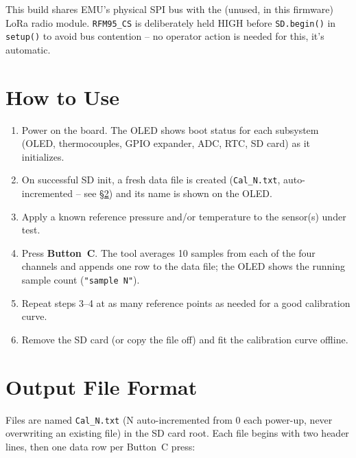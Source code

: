 \documentclass[11pt,letterpaper]{article}
\begin{document}
\begin{notebox}
This build shares EMU's physical SPI bus with the (unused, in this
firmware) LoRa radio module. \texttt{RFM95\_CS} is deliberately held HIGH
before \texttt{SD.begin()} in \texttt{setup()} to avoid bus contention --
no operator action is needed for this, it's automatic.
\end{notebox}

\section{How to Use}

\begin{enumerate}[nosep]
  \item Power on the board. The OLED shows boot status for each subsystem
        (OLED, thermocouples, GPIO expander, ADC, RTC, SD card) as it
        initializes.
  \item On successful SD init, a fresh data file is created
        (\texttt{Cal\_N.txt}, auto-incremented -- see §\ref{sec:output}) and
        its name is shown on the OLED.
  \item Apply a known reference pressure and/or temperature to the
        sensor(s) under test.
  \item Press \textbf{Button~C}. The tool averages 10 samples from each of
        the four channels and appends one row to the data file; the OLED
        shows the running sample count (\texttt{"sample N"}).
  \item Repeat steps 3--4 at as many reference points as needed for a
        good calibration curve.
  \item Remove the SD card (or copy the file off) and fit the calibration
        curve offline.
\end{enumerate}

\section{Output File Format}
\label{sec:output}

Files are named \texttt{Cal\_N.txt} (N auto-incremented from 0 each power-up,
never overwriting an existing file) in the SD card root. Each file begins
with two header lines, then one data row per Button~C press:
\end{document}
